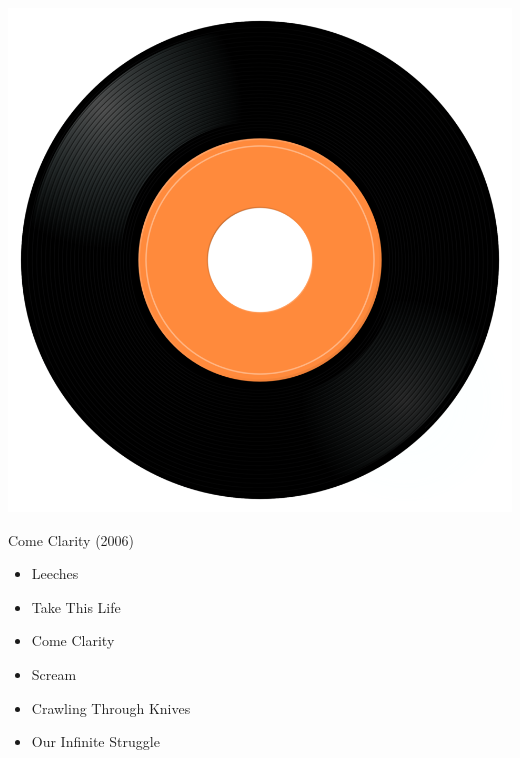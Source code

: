 \begin{minipage}[t]{0.25\textwidth}\vspace{0pt}
\captionsetup{type=figure}
\includegraphics[width=\textwidth]{Images/cover.png}
\caption*{Come Clarity (2006)}
\end{minipage}
\begin{minipage}[t]{0.25\textwidth}\vspace{0pt}
\begin{itemize}[nosep,leftmargin=1em,labelwidth=*,align=left]
	\setlength{\itemsep}{0pt}
	\item Leeches
	\item Take This Life
	\item Come Clarity
	\item Scream
	\item Crawling Through Knives
	\item Our Infinite Struggle
\end{itemize}
\end{minipage}
